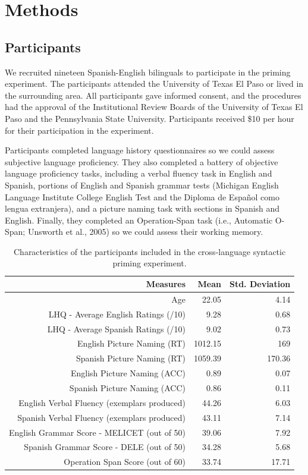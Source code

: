 \section{Methods}
\label{methods}

\subsection{Participants}
\label{participants}

We recruited nineteen Spanish-English bilinguals to participate in the priming experiment. The participants attended the University of Texas El Paso or lived in the surrounding area. All participants gave informed consent, and the procedures had the approval of the Institutional Review Boards of the University of Texas El Paso and the Pennsylvania State University. Participants received \$10 per hour for their participation in the experiment. 

Participants completed language history questionnaires so we could assess subjective language proficiency. They also completed a battery of objective language proficiency tasks, including a verbal fluency task in English and Spanish, portions of English and Spanish grammar tests (Michigan English Language Institute College English Test and the Diploma de Espa\~{n}ol como lengua extranjera), and a picture naming task with sections in Spanish and English. Finally, they completed an Operation-Span task (i.e., Automatic O-Span; Unsworth et al., 2005) so we could assess their working memory.

\begin{table}[htbp]
  \centering
  \caption{Characteristics of the participants included in the cross-language syntactic priming experiment.}
    \begin{tabular}{rrr}
    \toprule
    Measures & Mean  & Std. Deviation \\
    \midrule
    Age   & 22.05 & 4.14 \\
    LHQ - Average English Ratings (/10) & 9.28  & 0.68 \\
    LHQ - Average Spanish Ratings (/10) & 9.02  & 0.73 \\
    English Picture Naming (RT) & 1012.15 & 169 \\
    Spanish Picture Naming (RT) & 1059.39 & 170.36 \\
    English Picture Naming (ACC) & 0.89  & 0.07 \\
    Spanish Picture Naming (ACC) & 0.86  & 0.11 \\
    English Verbal Fluency (exemplars produced) & 44.26 & 6.03 \\
    Spanish Verbal Fluency (exemplars produced) & 43.11 & 7.14 \\
    English Grammar Score - MELICET (out of 50) & 39.06 & 7.92 \\
    Spanish Grammar Score - DELE (out of 50) & 34.28 & 5.68 \\
    Operation Span Score (out of 60) & 33.74 & 17.71 \\
    \bottomrule
    \end{tabular}%
  \label{tab:priming.subjectchar}%
\end{table}%

